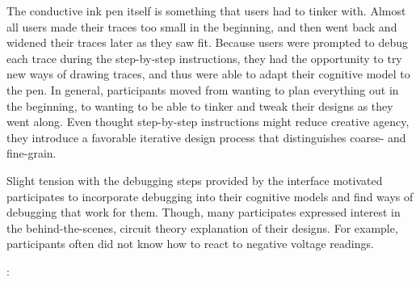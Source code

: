 \documentclass{sigchi}
\begin{document}
  The conductive ink pen itself is something that users had to tinker with. Almost all users made their traces too small in the beginning, and then went back and widened their traces later as they saw fit. Because users were prompted to debug each trace during the step-by-step instructions, they had the opportunity to try new ways of drawing traces, and thus were able to adapt their cognitive model to the pen.
  In general, participants moved from wanting to plan everything out in the beginning, to wanting to be able to tinker and tweak their designs as they went along. Even thought step-by-step instructions might reduce creative agency, they introduce a favorable iterative design process that distinguishes coarse- and fine-grain.
  
  
 Slight tension with the debugging steps provided by the interface motivated participates to incorporate debugging into their cognitive models and find ways of debugging that work for them. Though, many participates expressed interest in the behind-the-scenes, circuit theory explanation of their designs. For example, participants often did not know how to react to negative voltage readings.
  
  \begin{myquote}
   \vspace{-2pt}
    :
    \vspace{-2pt}
  \end{myquote}
  
\end{document}
